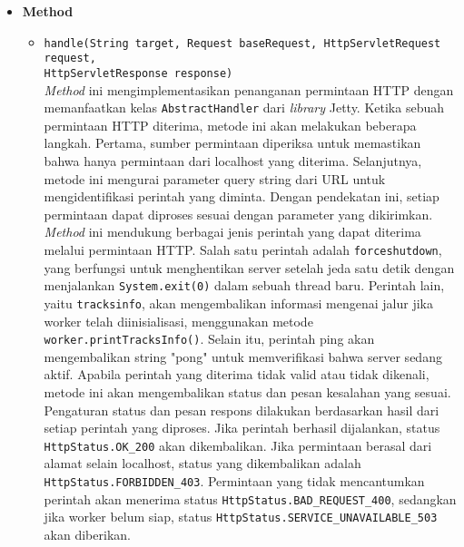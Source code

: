 \begin{itemize}
    \item \textbf{Method}
    \begin{itemize}
        \item \texttt{handle(String target, Request baseRequest, HttpServletRequest request, \\HttpServletResponse response)}
        \\ \textit{Method} ini mengimplementasikan penanganan permintaan HTTP dengan memanfaatkan kelas \texttt{AbstractHandler} dari \textit{library} Jetty. Ketika sebuah permintaan HTTP diterima, metode ini akan melakukan beberapa langkah. Pertama, sumber permintaan diperiksa untuk memastikan bahwa hanya permintaan dari localhost yang diterima. Selanjutnya, metode ini mengurai parameter query string dari URL untuk mengidentifikasi perintah yang diminta. Dengan pendekatan ini, setiap permintaan dapat diproses sesuai dengan parameter yang dikirimkan.
        \\ \textit{Method} ini mendukung berbagai jenis perintah yang dapat diterima melalui permintaan HTTP. Salah satu perintah adalah \texttt{forceshutdown}, yang berfungsi untuk menghentikan server setelah jeda satu detik dengan menjalankan \texttt{System.exit(0)} dalam sebuah thread baru. Perintah lain, yaitu \texttt{tracksinfo}, akan mengembalikan informasi mengenai jalur jika worker telah diinisialisasi, menggunakan metode \texttt{worker.printTracksInfo()}. Selain itu, perintah ping akan mengembalikan string "pong" untuk memverifikasi bahwa server sedang aktif. Apabila perintah yang diterima tidak valid atau tidak dikenali, metode ini akan mengembalikan status dan pesan kesalahan yang sesuai.
        \\ Pengaturan status dan pesan respons dilakukan berdasarkan hasil dari setiap perintah yang diproses. Jika perintah berhasil dijalankan, status \texttt{HttpStatus.OK\_200} akan dikembalikan. Jika permintaan berasal dari alamat selain localhost, status yang dikembalikan adalah \texttt{HttpStatus.FORBIDDEN\_403}. Permintaan yang tidak mencantumkan perintah akan menerima status \texttt{HttpStatus.BAD\_REQUEST\_400}, sedangkan jika worker belum siap, status \texttt{HttpStatus.SERVICE\_UNAVAILABLE\_503} akan diberikan.
    \end{itemize}
\end{itemize}


